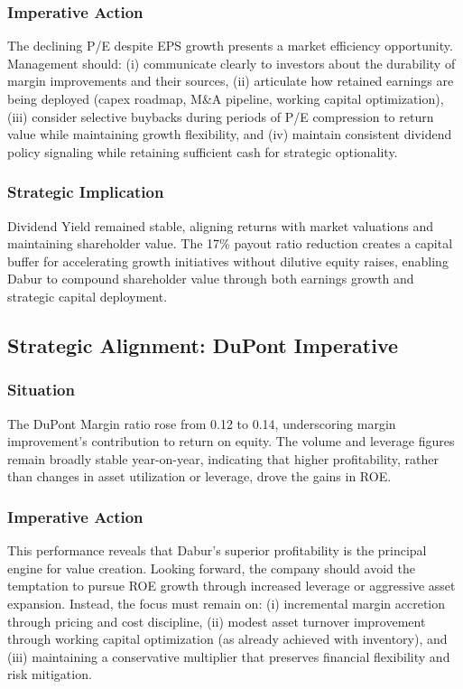 \documentclass[12pt, a4paper]{report}
\begin{document}
\subsubsection{Imperative Action}
The declining P/E despite EPS growth presents a market efficiency opportunity. Management should: (i) communicate clearly to investors about the durability of margin improvements and their sources, (ii) articulate how retained earnings are being deployed (capex roadmap, M\&A pipeline, working capital optimization), (iii) consider selective buybacks during periods of P/E compression to return value while maintaining growth flexibility, and (iv) maintain consistent dividend policy signaling while retaining sufficient cash for strategic optionality.

\subsubsection{Strategic Implication}
Dividend Yield remained stable, aligning returns with market valuations and maintaining shareholder value. The 17\% payout ratio reduction creates a capital buffer for accelerating growth initiatives without dilutive equity raises, enabling Dabur to compound shareholder value through both earnings growth and strategic capital deployment.

\subsection{Strategic Alignment: DuPont Imperative}

\subsubsection{Situation}
The DuPont Margin ratio rose from 0.12 to 0.14, underscoring margin improvement's contribution to return on equity. The volume and leverage figures remain broadly stable year-on-year, indicating that higher profitability, rather than changes in asset utilization or leverage, drove the gains in ROE.

\subsubsection{Imperative Action}
This performance reveals that Dabur's superior profitability is the principal engine for value creation. Looking forward, the company should avoid the temptation to pursue ROE growth through increased leverage or aggressive asset expansion. Instead, the focus must remain on: (i) incremental margin accretion through pricing and cost discipline, (ii) modest asset turnover improvement through working capital optimization (as already achieved with inventory), and (iii) maintaining a conservative multiplier that preserves financial flexibility and risk mitigation.
\end{document}
